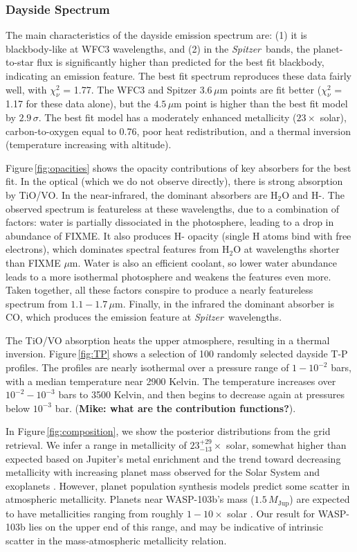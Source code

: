 \documentclass[twocolumn]{aastex61}
\newcommand{\project}[1]{\textsl{#1}}
\newcommand{\Spitzer}{\project{Spitzer}}
\begin{document}
\subsubsection{Dayside Spectrum}
The main characteristics of the dayside emission spectrum are: (1) it is blackbody-like at WFC3 wavelengths, and (2) in the \Spitzer\ bands, the planet-to-star flux is significantly higher than predicted for the best fit blackbody, indicating an emission feature.  The best fit spectrum reproduces these data fairly well, with $\chi^2_\nu$ = 1.77. The WFC3 and Spitzer $3.6\,\mu$m points are fit better ($\chi^2_\nu$  = 1.17 for these data alone), but the $4.5\,\mu$m point is higher than the best fit model by $2.9\,\sigma$.  The best fit model has a moderately enhanced metallicity ($23\times$ solar), carbon-to-oxygen equal to 0.76, poor heat redistribution, and a thermal inversion (temperature increasing with altitude).

Figure\,\ref{fig:opacities} shows the opacity contributions of key absorbers for the best fit.  In the optical (which we do not observe directly), there is strong absorption by TiO/VO.  In the near-infrared, the dominant absorbers are H$_2$O and H-.  The observed spectrum is featureless at these wavelengths, due to a combination of factors: water is partially dissociated in the photosphere, leading to a drop in abundance of FIXME.  It also produces H- opacity (single H atoms bind with free electrons), which dominates spectral features from H$_2$O at wavelengths shorter than FIXME $\mu$m.  Water is also an efficient coolant, so lower water abundance leads to a more isothermal photosphere and weakens the features even more.  Taken together, all these factors conspire to produce a nearly featureless spectrum from $1.1 - 1.7\,\mu$m. Finally, in the infrared the dominant absorber is CO, which produces the emission feature at \Spitzer\ wavelengths.  

The TiO/VO absorption heats the upper atmosphere, resulting in a thermal inversion. Figure\,\ref{fig:TP} shows a selection of 100 randomly selected dayside T-P profiles. The profiles are nearly isothermal over a pressure range of $1-10^{-2}$ bars, with a median temperature near 2900 Kelvin. The temperature increases over $10^{-2} - 10^{-3}$ bars to 3500 Kelvin, and then begins to decrease again at pressures below $10^{-3}$ bar. (\textbf{Mike: what are the contribution functions?}). 


In Figure\,\ref{fig:composition}, we show the posterior distributions from the grid retrieval.  We infer a range in metallicity of $23^{+29}_{-13}\times$ solar, somewhat higher than expected based on Jupiter's metal enrichment \citep[$3-5\times$ solar;][]{wong04} and the trend toward decreasing metallicity with increasing planet mass observed for the Solar System and exoplanets \cite[e.g.][]{kreidberg14b}.  However, planet population synthesis models predict some scatter in atmospheric metallicity. Planets near WASP-103b's mass ($1.5\,M_\mathrm{Jup}$) are expected to have metallicities ranging from roughly $1-10\times$ solar \citep{mordasini16}. Our result for WASP-103b lies on the upper end of this range, and may be indicative of intrinsic scatter in the mass-atmospheric metallicity relation. 
\end{document}
